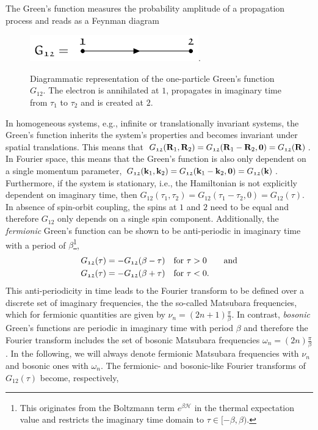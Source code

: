 \documentclass[\main/main.tex]{subfiles}
\begin{document}
The Green's function measures the probability amplitude of a propagation process and reads as a Feynman diagram
\begin{figure}[ht!]
	\centering
	\includegraphics[scale=1.2]{Graphics/Diagrams/one_p_green/one_p_green}.
	\caption{Diagrammatic representation of the one-particle Green's function $G_{\mathfrak{12}}$. The electron is annihilated at $\mathfrak{1}$, propagates in imaginary time from $\tau_1$ to $\tau_2$ and is created at $\mathfrak{2}$.}
	\label{fig:one_p_green}
\end{figure}

In homogeneous systems, e.g., infinite or translationally invariant systems, the Green's function inherits the system's properties and becomes invariant under spatial translations. This means that $G_{\mathfrak{12}}(\textbf{R}_1, \textbf{R}_2)=G_{\mathfrak{12}}(\textbf{R}_1-\textbf{R}_2,\textbf{0})=G_{\mathfrak{12}}(\textbf{R})$. In Fourier space, this means that the Green's function is also only dependent on a single momentum parameter, $G_{\mathfrak{12}}(\textbf{k}_1, \textbf{k}_2)=G_{\mathfrak{12}}(\textbf{k}_1-\textbf{k}_2,\textbf{0})=G_{\mathfrak{12}}(\textbf{k})$. Furthermore, if the system is stationary, i.e., the Hamiltonian is not explicitly dependent on imaginary time, then $G_{\mathfrak{12}}(\tau_1, \tau_2)=G_{\mathfrak{12}}(\tau_1-\tau_2,0)=G_{\mathfrak{12}}(\tau)$. In absence of spin-orbit coupling, the spins at $\mathfrak{1}$ and $\mathfrak{2}$ need to be equal and therefore $G_{\mathfrak{12}}$ only depends on a single spin component. Additionally, the \textit{fermionic} Green's function can be shown to be anti-periodic in imaginary time with a period of $\beta$\footnote{This originates from the Boltzmann term $e^{\beta\hat{\mathcal{H}}}$ in the thermal expectation value and restricts the imaginary time domain to $\tau\in[-\beta,\beta)$.},
\begin{subequations}
\begin{align}
	G_{\mathfrak{12}}(\tau)&=-G_{\mathfrak{12}}(\beta-\tau)\quad\text{for } \tau>0 \qquad\text{and}\\
	G_{\mathfrak{12}}(\tau)&=-G_{\mathfrak{12}}(\beta+\tau)\quad\text{for } \tau<0.
\end{align}
\end{subequations}
This anti-periodicity in time leads to the Fourier transform to be defined over a discrete set of imaginary frequencies, the the so-called Matsubara frequencies, which for fermionic quantities are given by $\nu_n=(2n+1)\frac\pi\beta$. In contrast, \textit{bosonic} Green's functions are periodic in imaginary time with period $\beta$ and therefore the Fourier transform includes the set of bosonic Matsubara frequencies $\omega_n=(2n)\frac\pi\beta$. In the following, we will always denote fermionic Matsubara frequencies with $\nu_n$ and bosonic ones with $\omega_n$. The fermionic- and bosonic-like Fourier transforms of $G_{\mathfrak{12}}(\tau)$ become, respectively,
\end{document}
